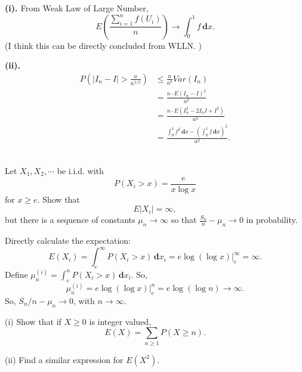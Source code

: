 \documentclass[en, normal, 11pt, black]{elegantnote}
\newenvironment{exercise}[1]{\begin{tcolorbox}[colback=black!15, colframe=black!80, breakable, title=#1]}{\end{tcolorbox}}
\renewenvironment{proof}{\begin{tcolorbox}[colback=white, colframe=black!50, breakable, title=Proof. ]\setlength{\parskip}{0.8em}}{\,\\\rightline{$\square$}\end{tcolorbox}}
\newcommand{\der}{\,\mathbf{d}}
\begin{document}
    \begin{proof}
        {\bfseries{(i). }}
        From Weak Law of Large Number, 
        \[
            E\left(\frac{\sum_{i=1}^nf(U_i)}{n}\right)\to \int_0^1f\der x. 
        \]
        (I think this can be directly concluded from WLLN. )

        {\bfseries{(ii). }}
        \[
            \begin{aligned}
                P\left(|I_n-I|>\frac{a}{n^{1/2}}\right)&\leqslant\frac{n}{a^2}Var(I_n)\\
                &=\frac{n\cdot E(I_n-I)^2}{a^2}\\
                &=\frac{n\cdot E(I_n^2-2I_nI+I^2)}{a^2}\\
                &=\frac{\int_0^1f^2\der x-\left(\int_0^1f\der x\right)^2}{a^2}. 
            \end{aligned}
        \]
        \vspace*{-30pt}
    \end{proof}

    \begin{exercise}{2.2.5}
        Let $X_{1}, X_{2}, \cdots$ be i.i.d. with 
        \[
            P\left(X_{i}>x\right)=\frac{e}{x \log x}
        \]
        for $x \geqslant e$. Show that 
        \[
            E\left|X_{i}\right|=\infty, 
        \]
        but there is a sequence of constants $\mu_{n} \rightarrow \infty$ so that $\frac{S_{n}}{n}-\mu_{n} \rightarrow 0$ in probability. 
    \end{exercise}

    \begin{proof}
        Directly calculate the expectation: 
        \[
            E(X_i)=\int_e^\infty P(X_i>x)\der x_i=e\log(\log x)\big|_e^\infty=\infty. 
        \]
        Define $\mu_n^{(i)}=\int_e^nP(X_i>x)\der x_i$. So, 
        \[
            \mu_n^{(i)}=e\log(\log x)\big|_e^n=e\log(\log n)\to\infty. 
        \]
        So, $S_n/n-\mu_n\to0$, with $n\to\infty$. 
    \end{proof}

    \begin{exercise}{2.2.6}
        (i) Show that if $X \geqslant 0$ is integer valued, 
        \[
            E(X)=\sum_{n \geqslant 1} P(X \geqslant n). 
        \]
        
        (ii) Find a similar expression for $E (X^{2})$. 
    \end{exercise}
\end{document}
